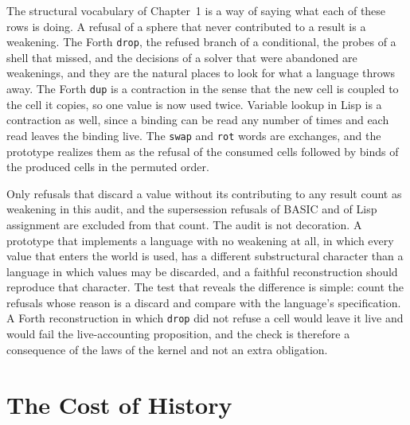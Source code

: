 The structural vocabulary of Chapter~1 is a way of saying what each of these rows is doing. A refusal of a sphere that never contributed to a result is a weakening. The Forth \texttt{drop}, the refused branch of a conditional, the probes of a shell that missed, and the decisions of a solver that were abandoned are weakenings, and they are the natural places to look for what a language throws away. The Forth \texttt{dup} is a contraction in the sense that the new cell is coupled to the cell it copies, so one value is now used twice. Variable lookup in Lisp is a contraction as well, since a binding can be read any number of times and each read leaves the binding live. The \texttt{swap} and \texttt{rot} words are exchanges, and the prototype realizes them as the refusal of the consumed cells followed by binds of the produced cells in the permuted order.

Only refusals that discard a value without its contributing to any result count as weakening in this audit, and the supersession refusals of BASIC and of Lisp assignment are excluded from that count. The audit is not decoration. A prototype that implements a language with no weakening at all, in which every value that enters the world is used, has a different substructural character than a language in which values may be discarded, and a faithful reconstruction should reproduce that character. The test that reveals the difference is simple: count the refusals whose reason is a discard and compare with the language's specification. A Forth reconstruction in which \texttt{drop} did not refuse a cell would leave it live and would fail the live-accounting proposition, and the check is therefore a consequence of the laws of the kernel and not an extra obligation.

\section{The Cost of History}

